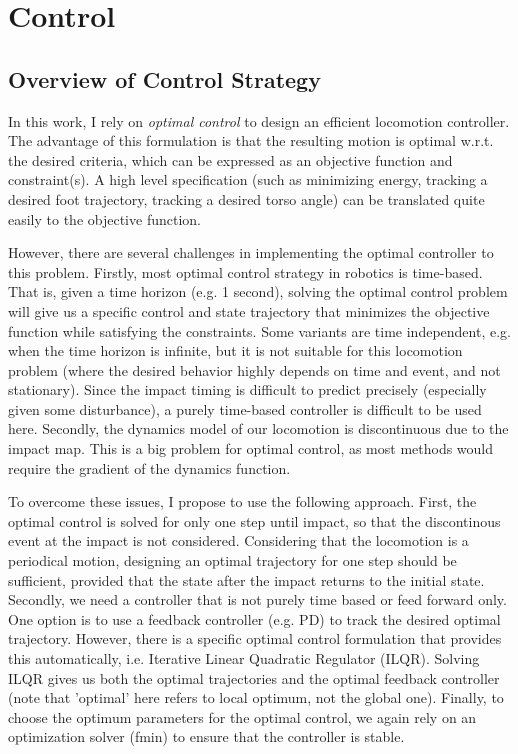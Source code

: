 \section{Control}
\label{sec:control}


\subsection{Overview of Control Strategy}
\label{sec:overview}

In this work, I rely on \emph{optimal control} to design an efficient locomotion controller. The advantage of this formulation is that the resulting motion is optimal w.r.t. the desired criteria, which can be expressed as an objective function and constraint(s). A high level specification (such as minimizing energy, tracking a desired foot trajectory, tracking a desired torso angle) can be translated quite easily to the objective function. 

However, there are several challenges in implementing the optimal controller to this problem. Firstly, most optimal control strategy in robotics is time-based. That is, given a time horizon (e.g. 1 second), solving the optimal control problem will give us a specific control and state trajectory that minimizes the objective function while satisfying the constraints. Some variants are time independent, e.g. when the time horizon is infinite, but it is not suitable for this locomotion problem (where the desired behavior highly depends on time and event, and not stationary). Since the impact timing is difficult to predict precisely (especially given some disturbance), a purely time-based controller is difficult to be used here. Secondly, the dynamics model of our locomotion is discontinuous due to the impact map. This is a big problem for optimal control, as most methods would require the gradient of the dynamics function. 

To overcome these issues, I propose to use the following approach. First, the optimal control is solved for only one step until impact, so that the discontinous event at the impact is not considered. Considering that the locomotion is a periodical motion, designing an optimal trajectory for one step should be sufficient, provided that the state after the impact returns to the initial state. 
Secondly, we need a controller that is not purely time based or feed forward only. One option is to use a feedback controller (e.g. PD) to track the desired optimal trajectory. However, there is a specific optimal control formulation that provides this automatically, i.e. Iterative Linear Quadratic Regulator (ILQR). Solving ILQR gives us both the optimal trajectories and the optimal feedback controller (note that 'optimal' here refers to local optimum, not the global one). 
Finally, to choose the optimum parameters for the optimal control, we again rely on an optimization solver (fmin) to ensure that the controller is stable.

